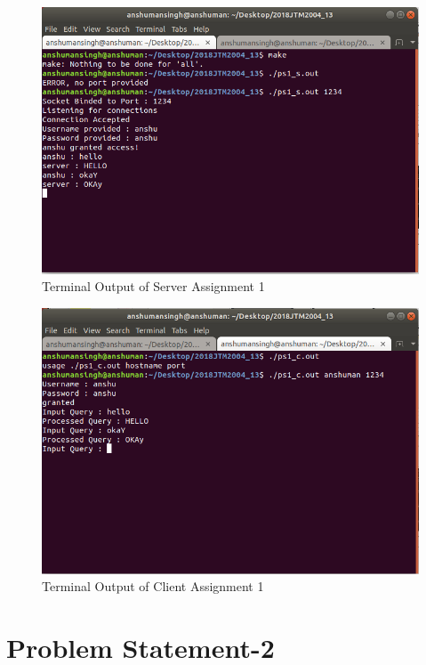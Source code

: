 \documentclass[12pt]{article}
\begin{document}
			\begin{figure}[h!]
				\centering
				\caption{Terminal Output of Server Assignment 1}
				\includegraphics[scale=.6]{ps1_o_1.png}
			\end{figure}
			\begin{figure}[h!]
				\centering
				\caption{Terminal Output of Client Assignment 1}
				\includegraphics[scale=.6]{ps1_o_2.png}
			\end{figure}

	\section{Problem Statement-2}
	
\end{document}
